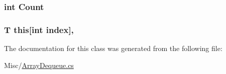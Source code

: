 \subsubsection[{Count}]{\setlength{\rightskip}{0pt plus 5cm}int Count\hspace{0.3cm}{\ttfamily [get]}}\label{classOTA_1_1Misc_1_1ArrayDeque_aad462966ed963f892117056de1eba502}
\hypertarget{classOTA_1_1Misc_1_1ArrayDeque_a4da03330824868fcb5ca5aad6031b3e3}{}
\subsubsection[{this[int index]}]{\setlength{\rightskip}{0pt plus 5cm}T this\mbox{[}int index\mbox{]}\hspace{0.3cm}{\ttfamily [get]}, {\ttfamily [set]}}\label{classOTA_1_1Misc_1_1ArrayDeque_a4da03330824868fcb5ca5aad6031b3e3}


The documentation for this class was generated from the following file\+:\begin{DoxyCompactItemize}
\item 
Misc/\hyperlink{ArrayDequeue_8cs}{Array\+Dequeue.\+cs}\end{DoxyCompactItemize}
